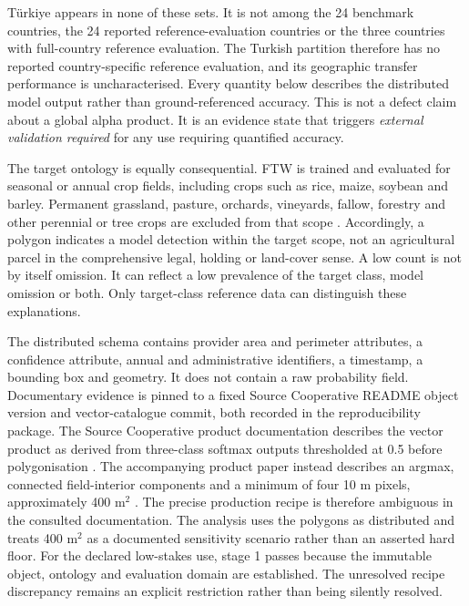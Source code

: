 \documentclass[pdflatex,sn-basic]{sn-jnl}
\begin{document}
Türkiye appears in none of these sets. It is not among the 24 benchmark countries, the 24 reported reference-evaluation countries or the three countries with full-country reference evaluation. The Turkish partition therefore has no reported country-specific reference evaluation, and its geographic transfer performance is uncharacterised. Every quantity below describes the distributed model output rather than ground-referenced accuracy. This is not a defect claim about a global alpha product. It is an evidence state that triggers \emph{external validation required} for any use requiring quantified accuracy.

The target ontology is equally consequential. FTW is trained and evaluated for seasonal or annual crop fields, including crops such as rice, maize, soybean and barley. Permanent grassland, pasture, orchards, vineyards, fallow, forestry and other perennial or tree crops are excluded from that scope \citep{kerner_fields_2025,robinson_first_2026}. Accordingly, a polygon indicates a model detection within the target scope, not an agricultural parcel in the comprehensive legal, holding or land-cover sense. A low count is not by itself omission. It can reflect a low prevalence of the target class, model omission or both. Only target-class reference data can distinguish these explanations.

The distributed schema contains provider area and perimeter attributes, a confidence attribute, annual and administrative identifiers, a timestamp, a bounding box and geometry. It does not contain a raw probability field. Documentary evidence is pinned to a fixed Source Cooperative README object version and vector-catalogue commit, both recorded in the reproducibility package. The Source Cooperative product documentation describes the vector product as derived from three-class softmax outputs thresholded at 0.5 before polygonisation \citep{fields_of_the_world_global_2026}. The accompanying product paper instead describes an argmax, connected field-interior components and a minimum of four 10 m pixels, approximately 400 m$^{2}$ \citep{robinson_first_2026}. The precise production recipe is therefore ambiguous in the consulted documentation. The analysis uses the polygons as distributed and treats 400 m$^{2}$ as a documented sensitivity scenario rather than an asserted hard floor. For the declared low-stakes use, stage 1 passes because the immutable object, ontology and evaluation domain are established. The unresolved recipe discrepancy remains an explicit restriction rather than being silently resolved.
\end{document}
